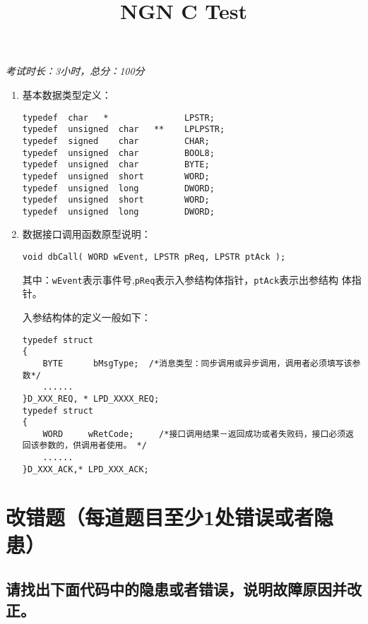 ﻿\documentclass  [11pt,twocolumn,landscape]{article}
\title{NGN C Test}
\author{}
\date{}
\begin{document}
\begin{minipage}{0.9\linewidth}
\end{minipage}

\begin{flushright}
{\small{\textit{考试时长：3小时，总分：100分}}}
\end{flushright}

\normalsize{}

\begin{enumerate}
    \item 基本数据类型定义：
\begin{lstlisting}
typedef  char   *               LPSTR;
typedef  unsigned  char   **    LPLPSTR;
typedef  signed    char         CHAR;
typedef  unsigned  char         BOOL8;
typedef  unsigned  char         BYTE;
typedef  unsigned  short        WORD;
typedef  unsigned  long         DWORD;
typedef  unsigned  short        WORD;
typedef  unsigned  long         DWORD;
\end{lstlisting}
    \item 数据接口调用函数原型说明：
\begin{lstlisting}
void dbCall( WORD wEvent, LPSTR pReq, LPSTR ptAck );
\end{lstlisting}
其中：\lstinline{wEvent}表示事件号,\lstinline{pReq}表示入参结构体指针，\lstinline{ptAck}表示出参结构
体指针。

入参结构体的定义一般如下：
\begin{lstlisting}
typedef struct 
{
    BYTE      bMsgType;  /*消息类型：同步调用或异步调用，调用者必须填写该参数*/
    ......
}D_XXX_REQ, * LPD_XXXX_REQ;
typedef struct
{
    WORD     wRetCode;     /*接口调用结果－返回成功或者失败码，接口必须返回该参数的，供调用者使用。 */
    ......
}D_XXX_ACK,* LPD_XXX_ACK;
\end{lstlisting}
\end{enumerate}

\section{改错题（每道题目至少1处错误或者隐患）}
\subsection{请找出下面代码中的隐患或者错误，说明故障原因并改正。}
\end{document}

